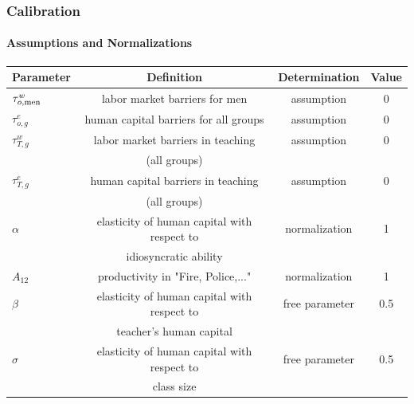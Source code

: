 \documentclass[11pt]{beamer}
\begin{document}
\begin{frame}
\frametitle{Calibration}
\framesubtitle{Assumptions and Normalizations}
\label{assump}
  \tiny
	
	\begin{table}[h!]
		\centering
		\begin{tabular}{lccc}
			\toprule
			Parameter & Definition & Determination & Value\\
			\midrule
			$\tau^{w}_{o,{\rm men}}$ & labor market barriers for men & assumption & 0 \\
			$\tau^{e}_{o,g}$ & human capital barriers for all groups & assumption & 0 \\
			$\tau^{w}_{T,g}$ & labor market barriers in teaching  & assumption & 0 \\
			& (all groups)&\\
			$\tau^{e}_{T,g}$ & human capital barriers in teaching & assumption & 0 \\
			& (all groups) & \\
			$\alpha$ & elasticity of human capital with respect to & normalization & 1 \\
			& idiosyncratic ability & \\
            $A_{12}$ & productivity in "Fire, Police,..." & normalization & 1 \\
   \midrule
   			$\beta$ & elasticity of human capital with respect to & free parameter & 0.5\\
    & teacher's human capital & \\
            $\sigma$ & elasticity of human capital with respect to & free parameter & 0.5 \\
            & class size & \\
			\bottomrule
		\end{tabular}
		\label{tab:assump}
	\end{table}
  \hyperlink{calib}{}
\end{frame}
\end{document}
